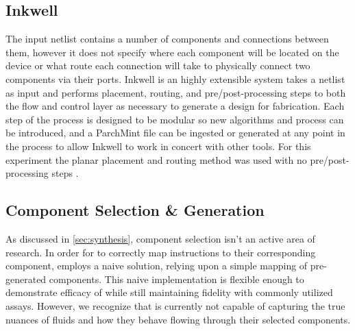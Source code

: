 \subsection{Inkwell}
\label{sec:inkwell}

The input netlist contains a number of components and connections between them, however it does not specify where each component will be located on the device or what route each connection will take to physically connect two components via their ports. Inkwell is an highly extensible system takes a netlist as input and performs placement, routing, and pre/post-processing steps to both the flow and control layer as necessary to generate a design for fabrication. Each step of the process is designed to be modular so new algorithms and process can be introduced, and a ParchMint file can be ingested or generated at any point in the process to allow Inkwell to work in concert with other tools. For this experiment the planar placement and routing method was used with no pre/post-processing steps \cite{mcdaniel2015flow}.


\subsection{Component Selection \& Generation}
\label{sec:component_selection}

As discussed in \cref{sec:synthesis}, component selection isn't an active area of research.
In order for \tool{} to correctly map \bs{} instructions to their corresponding component, \tool{} employs a naive solution, relying upon a simple mapping of pre-generated components.
This naive implementation is flexible enough to demonstrate efficacy of \tool{} while still maintaining fidelity with commonly utilized assays.
However, we recognize that \tool{} is currently not capable of capturing the true nuances of fluids and how they behave flowing through their selected components.

